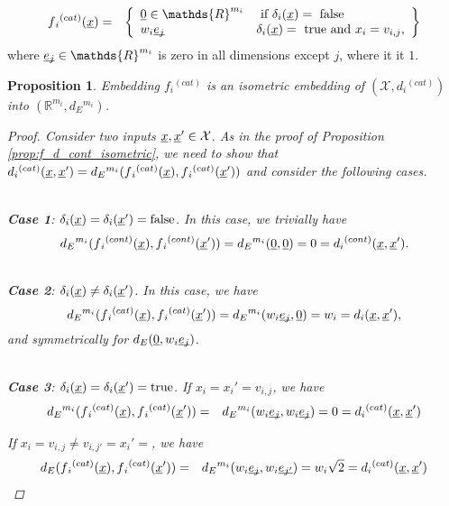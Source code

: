 \documentclass[letterpaper]{article}
\newcommand{\vect}[1]{\underline{\smash{#1}}}
\renewcommand{\v}[1]{\vect{#1}}
\newcommand{\reals}{\mathds{R}}
\newcommand{\sX}{\mathcal{X}}
\newtheorem{prop}[thm]{Proposition}
\begin{document}
\begin{eqnarray}
\nonumber{}f{_i}^{(cat)}(\v{x}) & = & \left\{\begin{array}{ll}
\v{0} \in \reals^{m_i} & \textrm{ if } \delta_i(\v{x}) = \textrm{ false }\\
\nonumber{} w_i \v{e_j} & \delta_i(\v{x}) = \textrm{ true and } x_i = v_{i,j},
\end{array}\right\}
\end{eqnarray}
\noindent{}where $\v{e_j} \in \reals^{m_i}$ is zero in all dimensions except $j$, where it it $1$.

\begin{prop}Embedding $f{_i}^{(cat)}$ is an isometric embedding of $(\sX, d{_i}^{(cat)})$ into $(\reals^{m_i},d{_E}^{m_i})$.
\label{prop:f_d_cat_isometric}
\begin{proof}
Consider two inputs $\v{x},\v{x}' \in \sX$. As in the proof of Proposition \ref{prop:f_d_cont_isometric}, we need to show that $d{_i}^{(cat)}(\v{x},\v{x}') = d{_E}^{m_i}(f{_i}^{(cat)}(\v{x}),f{_i}^{(cat)}(\v{x}'))$ and consider the following cases.

~\\\noindent{}\textbf{Case 1}: $\delta_i(\v{x}) = \delta_i(\v{x}') = \textrm{false}$.
In this case, we trivially have 
\[d{_E}^{m_i}(f{_i}^{(cont)}(\v{x}),f{_i}^{(cont)}(\v{x}')) = d{_E}^{m_i}(\v{0}, \v{0}) = 0 = d{_i}^{(cont)}(\v{x},\v{x}').\]

~\\\noindent{}\textbf{Case 2}: $\delta_i(\v{x}) \neq \delta_i(\v{x}')$. In this case, we have
\[d{_E}^{m_i}(f{_i}^{(cat)}(\v{x}),f{_i}^{(cat)}(\v{x}')) = d{_E}^{m_i}(w_i \v{e_j}, \v{0}) = w_i = d_i(\v{x},\v{x}'),\]
and symmetrically for $d_E(\v{0}, w_i \v{e_j})$.

~\\\noindent{}\textbf{Case 3}: $\delta_i(\v{x}) = \delta_i(\v{x}') = \textrm{true}$. 
If $x_i=x_i'=v_{i,j}$, we have 
\begin{eqnarray}
\nonumber{}d{_E}^{m_i}(f{_i}^{(cat)}(\v{x}),f{_i}^{(cat)}(\v{x}')) & = & d{_E}^{m_i}(w_i \v{e_j}, w_i \v{e_j}) = 0 = d{_i}^{(cat)}(\v{x}, \v{x}')
\end{eqnarray}

\noindent{}If $x_i=v_{i,j} \neq v_{i,j'} = x_i'=$, we have 
\begin{eqnarray} 
\nonumber{}d_E(f{_i}^{(cat)}(\v{x}),f{_i}^{(cat)}(\v{x}')) & = & d{_E}^{m_i}(w_i \v{e_j}, w_i \v{e_{j'}}) = w_i \sqrt{2} = d{_i}^{(cat)}(\v{x}, \v{x}')
\end{eqnarray}
\end{proof}
\end{prop}
\end{document}

